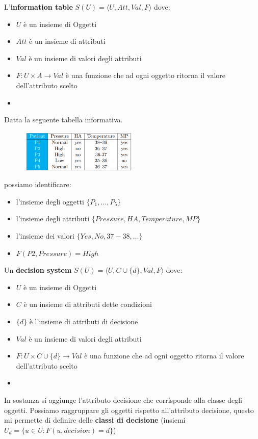 \begin{definizione} 
    L'\textbf{information table} $S(U) = \langle U, Att, Val, F\rangle$ dove:
    \begin{itemize}
        \item $U$ è un insieme di Oggetti
        \item $Att$ è un insieme di attributi
        \item $Val$ è un insieme di valori degli attributi
        \item $F:U\times A \to Val$ è una funzione che ad ogni oggetto ritorna il 
        valore dell'attributo scelto
        \item 
    \end{itemize}
\end{definizione}
\begin{esempio}
    Datta la seguente tabella informativa.
    \begin{figure}[!h]
        \centering
        \includegraphics[width=0.5\textwidth]{img/sistemi_incerti/i_t.png}
    \end{figure}
    possiamo identificare:
    \begin{itemize}
        \item l'insieme degli oggetti $\{P_1,\dots,P_5\}$
        \item l'insieme degli attributi $\{Pressure, HA, Temperature,MP\}$
        \item l'insieme dei valori $\{Yes, No, 37-38,\dots\}$
        \item $F(P2, Pressure)=High$
    \end{itemize}
\end{esempio}
\begin{definizione}
    Un \textbf{decision system} $S(U) = \langle U, C\cup \{d\}, Val, F\rangle$ dove:
    \begin{itemize}
        \item $U$ è un insieme di Oggetti
        \item $C$ è un insieme di attributi dette condizioni
        \item $\{d\}$ è l'insieme di attributi di decisione
        \item $Val$ è un insieme di valori degli attributi
        \item $F:U\times C\cup \{d\} \to Val$ è una funzione che ad ogni oggetto ritorna il 
        valore dell'attributo scelto
        \item 
    \end{itemize}
\end{definizione}
In sostanza si aggiunge l'attributo decisione che corrisponde alla classe degli oggetti.
Possiamo raggruppare gli oggetti rispetto all'attributo decisione, questo mi permette 
di definire delle \textbf{classi di decisione} (insiemi $U_d = \{u\in U: F(u, decision) =d\}$) 

